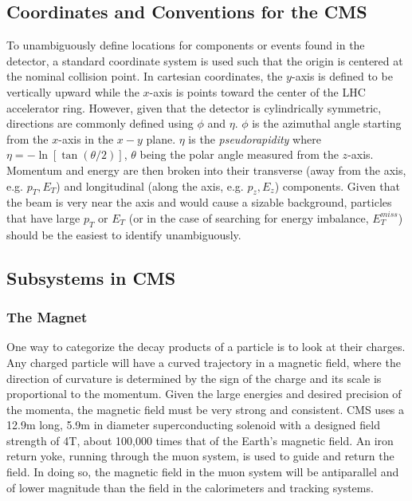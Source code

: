\subsection{Coordinates and Conventions for the CMS}
\label{sec:CoordinateConventions}

To unambiguously define locations for components or events found in the detector, a standard coordinate system is used such that the origin is centered at the nominal collision point. In cartesian coordinates, the $y$-axis is defined to be vertically upward while the $x$-axis is points toward the center of the LHC accelerator ring. However, given that the detector is cylindrically symmetric, directions are commonly defined using $\phi$ and $\eta$. $\phi$ is the azimuthal angle starting from the $x$-axis in the $x-y$ plane. $\eta$ is the \textit{pseudorapidity} where $\eta=-\ln[\tan(\theta/2)]$, $\theta$ being the polar angle measured from the $z$-axis. Momentum and energy are then broken into their transverse (away from the axis, e.g. $p_T,E_T$) and longitudinal (along the axis, e.g. $p_z,E_z$) components. Given that the beam is very near the axis and would cause a sizable background, particles that have large $p_T$ or $E_T$ (or in the case of searching for energy imbalance, $E_T^{miss}$) should be the easiest to identify unambiguously.

\subsection{Subsystems in CMS}
\label{sec:CMSSubsystem}

\subsubsection{The Magnet}
\label{sec:Magnet}

One way to categorize the decay products of a particle is to look at their charges. Any charged particle will have a curved trajectory in a magnetic field, where the direction of curvature is determined by the sign of the charge and its scale is proportional to the momentum. Given the large energies and desired precision of the momenta, the magnetic field must be very strong and consistent. CMS uses a 12.9m long, 5.9m in diameter superconducting solenoid with a designed field strength of 4T, about 100,000 times that of the Earth's magnetic field. An iron return yoke, running through the muon system, is used to guide and return the field. In doing so, the magnetic field in the muon system will be antiparallel and of lower magnitude than the field in the calorimeters and tracking systems.

